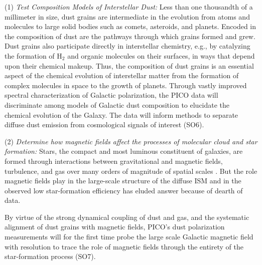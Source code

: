 \documentclass[PICOReport.tex]{subfiles}
\begin{document}
(1) {\em Test Composition Models of Interstellar Dust:} 
Less than one thousandth of a millimeter in size, dust grains are intermediate in the evolution from atoms and molecules to large solid bodies such as comets, asteroids, and planets. Encoded in the composition of dust are the pathways through which grains formed and grew. Dust grains also participate directly in interstellar chemistry, e.g., by catalyzing the formation of H$_2$ and organic molecules on their surfaces, in ways that depend upon their chemical makeup. Thus, the composition of dust grains is an essential aspect of the chemical evolution of interstellar matter from the formation of complex molecules in space to the growth of planets. Through vastly improved spectral characterization of Galactic polarization, the PICO data will discriminate among models of Galactic dust composition to elucidate the chemical evolution of the Galaxy. The data will inform methods to separate diffuse dust emission from cosmological signals of interest (SO6). %


(2) {\em Determine how magnetic fields affect the processes of molecular cloud and star formation:}
Stars, the compact and most luminous constituent of galaxies, are formed through interactions between gravitational and magnetic fields, turbulence, and gas over many orders of magnitude of spatial scales . But the role magnetic fields play in the large-scale structure of the diffuse \ac{ISM} and in the observed low star-formation efficiency has eluded answer because of dearth of data. 

By virtue of the strong dynamical coupling of dust and gas, and the systematic alignment of dust grains with magnetic fields, PICO's dust polarization measurements will for the first time probe the large scale Galactic magnetic field with resolution to trace the role of magnetic fields through the entirety of the star-formation process (SO7). 

\end{document}
